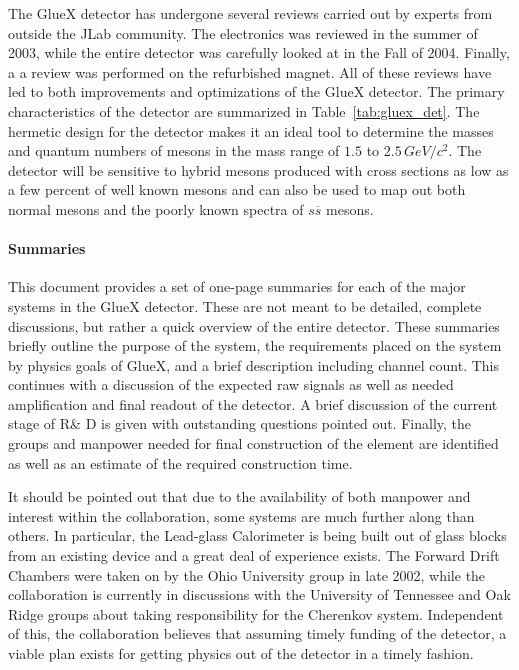 \hspace{1cm}
The GlueX detector has undergone several reviews carried out by experts from
outside the JLab community. The electronics was reviewed in the summer of
2003, while the entire detector was carefully looked at in the Fall of 2004.
Finally, a a review was performed on the refurbished magnet. All of these
reviews have led to both improvements and optimizations of the GlueX
detector. The primary characteristics of the detector are summarized in 
Table~\ref{tab:gluex_det}.  The hermetic design for the detector makes it 
an ideal tool to determine the masses and quantum numbers of mesons in the 
mass range of $1.5$ to $2.5\, GeV/c^{2}$. The detector will be sensitive 
to hybrid mesons produced with cross sections as low as a few percent
of well known mesons and can also be used to map out both normal mesons and
the poorly known spectra of $s\overline{s}$ mesons.

\hspace{1cm}
\paragraph{Summaries} This document provides a set of one-page summaries for each of the 
major systems in the GlueX detector. These are not meant to be
detailed, complete discussions, but rather a quick overview of the
entire detector. These summaries briefly outline the 
purpose of the system, the requirements placed on the system by
physics goals of GlueX, and a brief description including channel 
count. This continues with  a discussion of the expected raw signals 
as well as needed amplification and final readout of the detector.
A brief discussion of the current stage of R\& D is given with 
outstanding questions pointed out. Finally, the groups and manpower
needed for final construction of the element are identified as 
well as an estimate of the required construction time. 


\hspace{1cm}
It should be pointed out that due to the availability of both manpower
and interest within the collaboration, some systems are much further
along than others. In particular, the Lead-glass Calorimeter is
being built out of glass blocks from an existing device and a great
deal of experience exists. The Forward Drift Chambers were taken on
by the Ohio University group in late 2002, while the collaboration is
currently in discussions with the University of Tennessee and Oak
Ridge groups about taking responsibility for the Cherenkov system.
Independent of this, the collaboration believes that assuming timely
funding of the detector, a viable plan exists for getting physics 
out of the detector in a timely fashion. 

